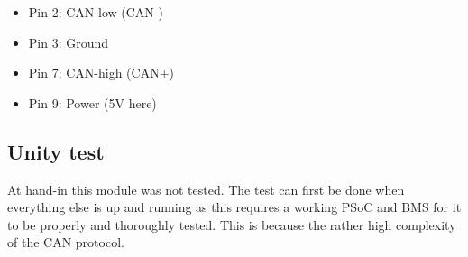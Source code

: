 	\begin{itemize}
		\item Pin 2: CAN-low (CAN-)
		\item Pin 3: Ground
		\item Pin 7: CAN-high (CAN+)
		\item Pin 9: Power (5V here)
	\end{itemize} \cite{CAN-Connection}

\subsection{Unity test}
At hand-in this module was not tested. The test can first be done when everything else is up and running as this requires a working PSoC and BMS for it to be properly and thoroughly tested. This is because the rather high complexity of the CAN protocol. 